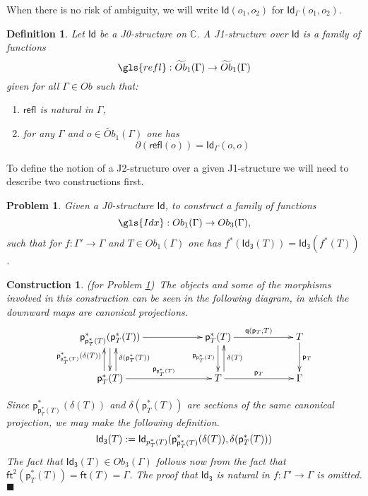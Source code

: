 \documentclass[12pt]{article}
\numberwithin{equation}{section}
\newenvironment{eq}{\begin{equation}}{\end{equation}}
\newtheorem{definition}[proposition]{Definition}
\newtheorem{problem}[proposition]{Problem}
\newtheorem{construction0}[proposition]{Construction}
\newenvironment{construction}[1]{\begin{construction0}(for Problem \ref{#1})\ }{$\blacksquare$ \end{construction0}}
\newcommand{\sr}{\rightarrow}
\newcommand{\wt}{\widetilde}
\newcommand{\CC}{{\mathbb C}}  %
\newcommand{\ft}{\mathsf{ft}}
\newcommand{\p}{\mathsf{p}}
\newcommand{\q}{\mathsf{q}}
\newcommand{\Id}{\mathsf{Id}} %
\newcommand{\Idx}{\mathsf{Id_3}} %
\newcommand{\refl}{\mathsf{refl}}
\newcommand{\Obwt}{\wt{Ob}}
\begin{document}
When there is no risk of ambiguity, we will write $\Id(o_1,o_2)$ for $\Id_{\Gamma}(o_1,o_2)$.

\begin{definition}
\label{2015.03.27.def2}
Let $\Id$ be a J0-structure on $\CC$. A {\em J1-structure} over $\Id$ is a family of
functions
%
$$\gls{refl}:\Obwt_1(\Gamma)\sr \Obwt_1(\Gamma)$$
%
given for all $\Gamma\in Ob$ such that:
%
\begin{enumerate}
\item $\refl$ is natural in $\Gamma$,
\item for any $\Gamma$ and $o\in \Obwt_1(\Gamma)$ one has 
%
\begin{eq}
\label{2015.03.27.eq8}
\partial(\refl(o))=\Id_\Gamma(o,o)
\end{eq}%
\end{enumerate}
\end{definition}
%
To define the notion of a J2-structure over a given J1-structure we will need
to describe two constructions first.

%
\begin{problem}
\label{2015.03.27.prob1} Given a J0-structure $\Id$, to construct a family of
functions
%
$$\gls{Idx}:Ob_1(\Gamma)\sr Ob_3(\Gamma),$$
%
such that for $f:\Gamma'\sr \Gamma$ and $T\in Ob_1(\Gamma)$ one has
$f^*(\Idx(T))=\Idx(f^*(T))$.
\end{problem}
%
\begin{construction}{2015.03.27.prob1}\label{2015.03.27.constr1}\rm
The objects and some of the morphisms involved
in this construction can be seen in the following diagram, in which the
downward maps are canonical projections.
%
\begin{eq}
  \begin{xy}
    \xymatrix@C=5pc{
      \p_{\p_T^*(T)}^*(\p_T^*(T)) \ar[r] \ar[d]                             &
      \p_T^*(T) \ar[r]^{\q(\p_T,T)} \ar[d]_{\p_{\p_T^*(T)}}                     &
      T \ar[d]^{\p_T}                                                      \\
      \p_T^*(T) \ar[r]^{\p_{\p_T^*(T)}}
                \ar@<-6pt>[u]_{\delta(\p_T^*(T))} 
                \ar@<6pt> [u]^{\p_{\p_T^*(T)}^*(\delta(T))}
                                                                         &
      T \ar[r]^{\p_T} \ar@<-6pt>[u]_{\delta(T)}                             &
      \Gamma
    }
  \end{xy}
\end{eq}%

Since $\p_{\p_T^*(T)}^*(\delta(T))$ and $\delta(\p_T^*(T))$ are sections of the
same canonical projection, we may make the following definition.
\begin{eq}
\label{2015.04.06.eq1}
\Idx(T):=\Id_{\\p_T^*(T)}(\p_{\p_T^*(T)}^*(\delta(T)), \delta(\p_T^*(T)))
\end{eq}%
The fact that $\Idx(T)\in Ob_3(\Gamma)$ follows now from the fact that
$\ft^2(\p_T^*(T))=\ft(T)=\Gamma$.
The proof that $\Idx$ is natural in $f:\Gamma'\sr \Gamma$ is omitted.
\end{construction}
\end{document}
